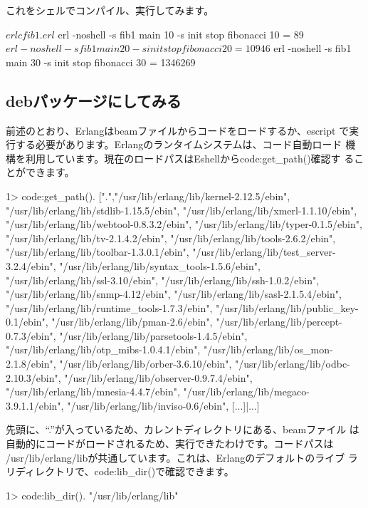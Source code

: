 \documentclass[mingoth,a4paper]{jsarticle}
\begin{document}
これをシェルでコンパイル、実行してみます。
\begin{commandline}
$ erlc fib1.erl
$ erl -noshell -s fib1 main 10 -s init stop
fibonacci 10 = 89
$ erl -noshell -s fib1 main 20 -s init stop
fibonacci 20 = 10946
$ erl -noshell -s fib1 main 30 -s init stop
fibonacci 30 = 1346269
\end{commandline}

\subsection{debパッケージにしてみる}
前述のとおり、Erlangはbeamファイルからコードをロードするか、escript
で実行する必要があります。Erlangのランタイムシステムは、コード自動ロード
機構を利用しています。現在のロードパスはEshellからcode:get\_path()確認す
ることができます。

\begin{commandline}
1> code:get_path().
[".","/usr/lib/erlang/lib/kernel-2.12.5/ebin",
 "/usr/lib/erlang/lib/stdlib-1.15.5/ebin",
 "/usr/lib/erlang/lib/xmerl-1.1.10/ebin",
 "/usr/lib/erlang/lib/webtool-0.8.3.2/ebin",
 "/usr/lib/erlang/lib/typer-0.1.5/ebin",
 "/usr/lib/erlang/lib/tv-2.1.4.2/ebin",
 "/usr/lib/erlang/lib/tools-2.6.2/ebin",
 "/usr/lib/erlang/lib/toolbar-1.3.0.1/ebin",
 "/usr/lib/erlang/lib/test_server-3.2.4/ebin",
 "/usr/lib/erlang/lib/syntax_tools-1.5.6/ebin",
 "/usr/lib/erlang/lib/ssl-3.10/ebin",
 "/usr/lib/erlang/lib/ssh-1.0.2/ebin",
 "/usr/lib/erlang/lib/snmp-4.12/ebin",
 "/usr/lib/erlang/lib/sasl-2.1.5.4/ebin",
 "/usr/lib/erlang/lib/runtime_tools-1.7.3/ebin",
 "/usr/lib/erlang/lib/public_key-0.1/ebin",
 "/usr/lib/erlang/lib/pman-2.6/ebin",
 "/usr/lib/erlang/lib/percept-0.7.3/ebin",
 "/usr/lib/erlang/lib/parsetools-1.4.5/ebin",
 "/usr/lib/erlang/lib/otp_mibs-1.0.4.1/ebin",
 "/usr/lib/erlang/lib/os_mon-2.1.8/ebin",
 "/usr/lib/erlang/lib/orber-3.6.10/ebin",
 "/usr/lib/erlang/lib/odbc-2.10.3/ebin",
 "/usr/lib/erlang/lib/observer-0.9.7.4/ebin",
 "/usr/lib/erlang/lib/mnesia-4.4.7/ebin",
 "/usr/lib/erlang/lib/megaco-3.9.1.1/ebin",
 "/usr/lib/erlang/lib/inviso-0.6/ebin",
 [...]|...]
\end{commandline}

先頭に、``.''が入っているため、カレントディレクトリにある、beamファイル
は自動的にコードがロードされるため、実行できたわけです。コードパスは
/usr/lib/erlang/libが共通しています。これは、Erlangのデフォルトのライブ
ラリディレクトリで、code:lib\_dir()で確認できます。

\begin{commandline}
1> code:lib_dir(). 
"/usr/lib/erlang/lib"
\end{commandline}
\end{document}

